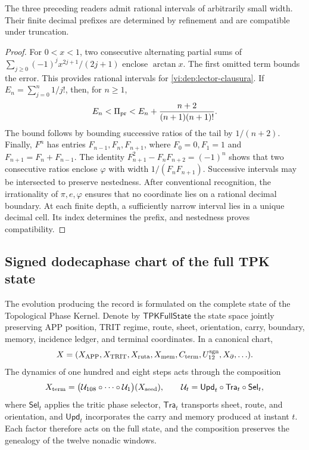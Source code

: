 \begin{proposition}
\label{vi:dep:prefijos}
The three preceding readers admit rational intervals of arbitrarily
small width. Their finite decimal prefixes are determined by
refinement and are compatible under truncation.
\end{proposition}
\begin{proof}
For \(0<x<1\), two consecutive alternating partial sums of
\(\sum_{j\ge0}(-1)^jx^{2j+1}/(2j+1)\) enclose \(\arctan x\).
The first omitted term bounds the error. This provides rational
intervals for \eqref{vi:dep:lector-clausura}.
If \(E_n=\sum_{j=0}^n1/j!\), then, for \(n\ge1\),
\[
 E_n<\Pi_{\rm pr}<E_n+
 \frac{n+2}{(n+1)(n+1)!}.
\]
The bound follows by bounding successive ratios of the tail by
\(1/(n+2)\). Finally, \(F^n\) has entries
\(F_{n-1},F_n,F_{n+1}\), where \(F_0=0,F_1=1\) and
\(F_{n+1}=F_n+F_{n-1}\). The identity
\(F_{n+1}^2-F_nF_{n+2}=(-1)^n\) shows that two consecutive ratios
enclose \(\varphi\) with width \(1/(F_nF_{n+1})\).
Successive intervals may be intersected to preserve
nestedness. After conventional recognition, the irrationality of
\(\pi,e,\varphi\) ensures that no coordinate lies on a rational
decimal boundary. At each finite depth, a sufficiently
narrow interval lies in a unique decimal cell. Its index
determines the prefix, and nestedness proves compatibility.
\end{proof}

\subsection{Signed dodecaphase chart of the full TPK state}
\label{vi:dep:estado-pleno}

The evolution producing the record is formulated on the complete state of the
Topological Phase Kernel. Denote by
\(\mathsf{TPKFullState}\) the state space jointly preserving
APP position, TRIT regime, route, sheet, orientation, carry, boundary,
memory, incidence ledger, and terminal coordinates. In a canonical chart,
\[
 X=(X_{\rm APP},X_{\rm TRIT},X_{\rm ruta},X_{\rm mem},
       C_{\rm term},U_{12}^{\rm sgn},X_{\partial},\ldots).
\]
The dynamics of one hundred and eight steps acts through the composition
\begin{equation}
 X_{\rm term}
 =\bigl(\mathcal U_{108}\circ\cdots\circ\mathcal U_1\bigr)(X_{\rm seed}),
 \qquad
 \mathcal U_t=\mathsf{Upd}_t\circ\mathsf{Tra}_t\circ\mathsf{Sel}_t,
 \label{vi:dep:estado-terminal-108}
\end{equation}
where \(\mathsf{Sel}_t\) applies the tritic phase selector,
\(\mathsf{Tra}_t\) transports sheet, route, and orientation, and
\(\mathsf{Upd}_t\) incorporates the carry and memory produced at
instant \(t\). Each factor therefore acts on the full state, and the
composition preserves the genealogy of the twelve nonadic windows.

